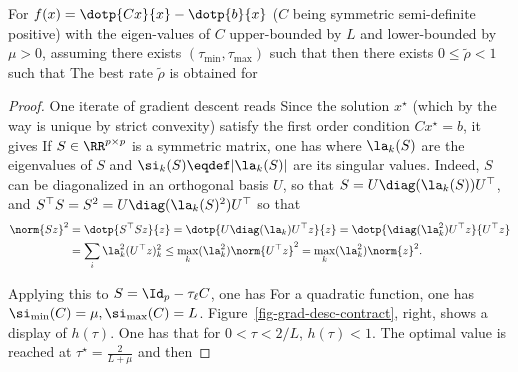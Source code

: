 \begin{prop}\label{prop-graddesc-quad}
	For $f(x)=\dotp{Cx}{x}-\dotp{b}{x}$ ($C$ being symmetric semi-definite positive) with the eigen-values of $C$ upper-bounded by $L$ and lower-bounded by $\mu>0$, assuming there exists $(\tau_{\min},\tau_{\max})$ such that
	then there exists $0 \leq \tilde\rho<1$ such that 
	The best rate $\tilde\rho$ is obtained for 
\end{prop}
\begin{proof}
	One iterate of gradient descent reads 
	Since the solution $x^\star$ (which by the way is unique by strict convexity) satisfy the first order condition $C x^\star=b$, it gives
	If $S \in \RR^{p \times p}$ is a symmetric matrix, one has 
	where $\la_k(S)$ are the eigenvalues of $S$ and $\si_k(S) \eqdef |\la_k(S)|$ are its singular values.
	Indeed, $S$ can be diagonalized in an orthogonal basis $U$, so that $S=U \diag(\la_k(S)) U^\top$,
	and $S^\top S = S^2 = U \diag(\la_k(S)^2) U^\top$ so that 
	\begin{align*}
		\norm{Sz}^2 &= \dotp{S^\top S z}{z} = \dotp{U \diag(\la_k) U^\top z}{z}		 
		=\dotp{\diag(\la_k^2) U^\top z}{U^\top z} \\
		&= \sum_i \la_k^2 (U^\top z)_k^2 \leq \max_k(\la_k^2) \norm{U^\top z}^2
		= \max_k(\la_k^2) \norm{z}^2.
	\end{align*}
	
	Applying this to $S = \Id_p-\tau_\ell C$, one has
	For a quadratic function, one has $\si_{\min}(C) = \mu, \si_{\max}(C)=L$. Figure~\ref{fig-grad-desc-contract}, right, shows a display of $h(\tau)$. One has that for $0<\tau<2/L$, $h(\tau)<1$.
	The optimal value is reached at $\tau^\star = \frac{2}{L+\mu}$ and then 
\end{proof}



